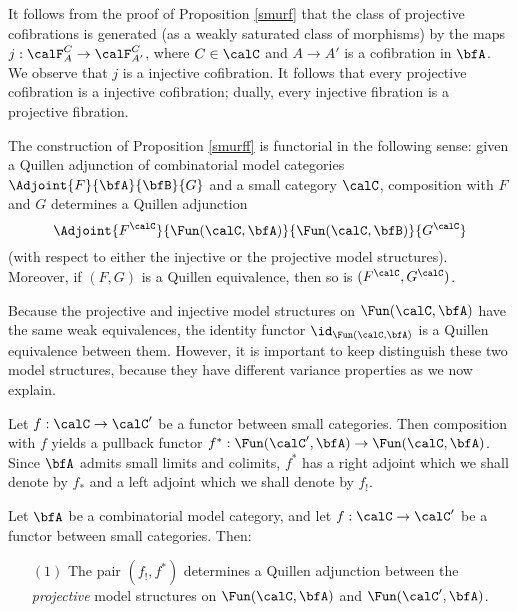 \begin{Model Categories}
\begin{Didn't Read}
\begin{remark}\label{postsmurff}
It follows from the proof of Proposition \ref{smurf} that the class of projective cofibrations
is generated (as a weakly saturated class of morphisms) by the maps $j: \calF^{C}_{A} \rightarrow \calF^{C}_{A'}$, where $C \in \calC$ and $A \rightarrow A'$ is a cofibration in $\bfA$. 
We observe that $j$ is a injective cofibration. It follows that every projective cofibration is a injective cofibration; dually, every injective fibration is a projective fibration.
\end{remark}

\begin{remark}\label{twofus}
The construction of Proposition \ref{smurff} is functorial in the following sense:
given a Quillen adjunction of combinatorial model categories
$\Adjoint{F}{\bfA}{\bfB}{G}$ and
a small category $\calC$, composition with $F$ and $G$ determines a Quillen adjunction
$$ \Adjoint{ F^{\calC}}{\Fun(\calC, \bfA)}{\Fun(\calC, \bfB)}{G^{\calC}}$$
(with respect to either the injective or the projective model structures).
Moreover, if $(F,G)$ is a Quillen equivalence, then so is $( F^{\calC}, G^{\calC} )$.
\end{remark}

Because the projective and injective model structures on
$\Fun(\calC, \bfA)$ have the same weak equivalences, the identity
functor $\id_{\Fun(\calC, \bfA)}$ is a Quillen equivalence between them. However, it is
important to keep distinguish these two model structures, because
they have different variance properties as we now explain.

Let $f: \calC \rightarrow \calC'$ be a functor between small categories. Then
composition with $f$ yields a pullback functor $f^{\ast}:
\Fun(\calC', \bfA) \rightarrow \Fun(\calC, \bfA)$. Since $\bfA$ admits small limits and colimits, $f^{\ast}$ has a right adjoint which we shall denote by $f_{\ast}$ and a left
adjoint which we shall denote by $f_{!}$.

\begin{proposition}\label{colbinn}
Let $\bfA$ be a combinatorial model category,
and let $f: \calC \rightarrow \calC'$ be a functor between small categories.
Then:

\begin{itemize}
\item[$(1)$] The pair $( f_{!}, f^{\ast} )$ determines a Quillen
adjunction between the {\em projective} model structures on
$\Fun(\calC, \bfA)$ and $\Fun(\calC', \bfA)$.


\end{itemize}
\end{proposition}
\end{Didn't Read}
\end{Model Categories}
